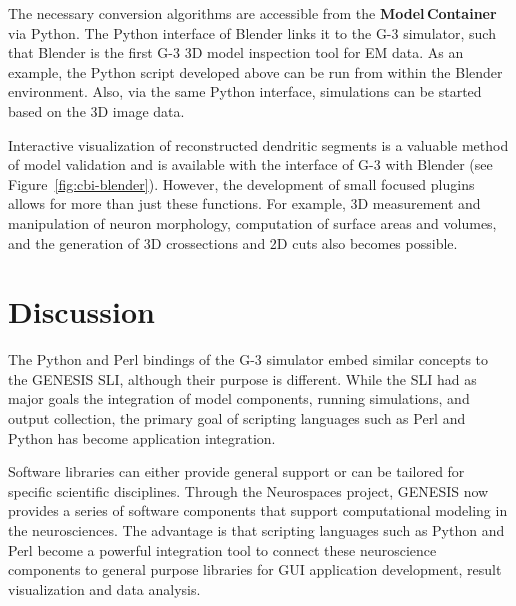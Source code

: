 \documentclass[12pt]{article}
\begin{document}
The necessary conversion algorithms are accessible from the
{\bf Model\,Container} via Python.  The Python interface of Blender links it to the G-3
simulator, such that Blender is the first G-3 3D model inspection
tool for EM data.  As an example, the Python script developed above
can be run from within the Blender environment.  Also, via the same
Python interface, simulations can be started based on the 3D image
data.

Interactive visualization of reconstructed dendritic segments is a
valuable method of model validation and is available with the
interface of G-3 with Blender (see Figure~\ref{fig:cbi-blender}).
However, the development of small focused plugins allows for more than
just these functions. For example, 3D measurement and manipulation of
neuron morphology, computation of surface areas and volumes, and the
generation of 3D crossections and 2D cuts also becomes possible.

\section{Discussion}

The Python and Perl bindings of the G-3 simulator embed similar
concepts to the GENESIS SLI, although their purpose is different.
While the SLI had as major goals the integration of model components,
running simulations, and output collection, the primary goal of
scripting languages such as Perl and Python has become application
integration.

Software libraries can either provide general support or can be
tailored for specific scientific disciplines.  Through the Neurospaces
project, GENESIS now provides a series of software components that
support computational modeling in the neurosciences.  The advantage is
that scripting languages such as Python and Perl become a powerful
integration tool to connect these neuroscience components to general
purpose libraries for GUI application development, result
visualization and data analysis.
\end{document}
